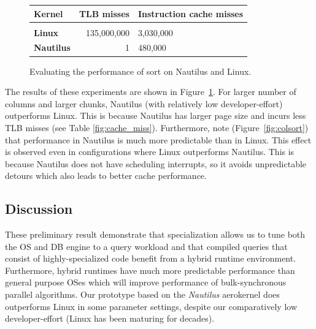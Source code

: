 \documentclass[conference]{IEEEtran}
\begin{document}
\begin{figure}[t]
  \hspace{0.01\linewidth}
  \begin{minipage}{0.31\linewidth}
    \centering
      \begin{tabular}{l || r | p{1.6cm} }
        \textbf{Kernel}    & TLB misses  & Instruction cache misses \\[1mm]
        \hline\hline&&\\[-2mm]
        \textbf{Linux}     & 135,000,000 & 3,030,000 \\[2mm]
         \textbf{Nautilus} &           1 &   480,000 \\[2mm]
      \end{tabular}

    \label{fig:cache_miss}
  \end{minipage}

\caption{Evaluating the performance of sort on Nautilus and Linux.}
  \label{fig:perf-eval}
\end{figure}

The results of these experiments are shown in Figure~\ref{fig:perf-eval}. For larger number of columns and larger chunks, Nautilus (with relatively low developer-effort) outperforms Linux. This is because Nautilus has larger page size and incurs less TLB misses (see Table \ref{fig:cache_miss}). Furthermore, note (Figure~\ref{fig:colsort}) that performance in Nautilus is much more predictable than in Linux. This effect is observed even in configurations where Linux outperforms Nautilus. This is because Nautilus does not have scheduling interrupts, so it avoids unpredictable detours which also leads to better cache performance.


\subsection{Discussion}
\label{sec:discussion}


These preliminary result demonstrate that specialization allows us to tune both the OS and DB engine to a query workload and that compiled queries that consist of highly-specialized code benefit from a hybrid runtime environment.
Furthermore, hybrid runtimes have much more predictable performance than general purpose OSes which will improve performance of bulk-synchronous parallel algorithms.
Our prototype based on the \emph{Nautilus} aerokernel does outperforms Linux in some parameter settings, despite our comparatively low developer-effort (Linux has been maturing for decades).
\end{document}
